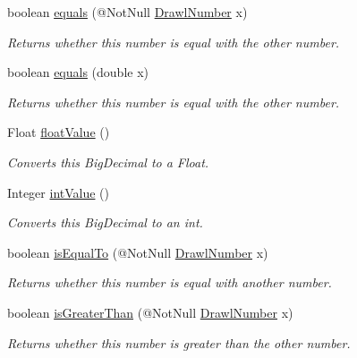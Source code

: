 \begin{DoxyCompactItemize}
boolean \hyperlink{classcom_1_1aarrelaakso_1_1drawl_1_1_drawl_number_aec32f189f8dadb219bf445be55ea0def}{equals} (@Not\+Null \hyperlink{classcom_1_1aarrelaakso_1_1drawl_1_1_drawl_number}{Drawl\+Number} x)
\begin{DoxyCompactList}\small\item\em Returns whether this number is equal with the other number. \end{DoxyCompactList}\item 
boolean \hyperlink{classcom_1_1aarrelaakso_1_1drawl_1_1_drawl_number_acd9190a42d7771c2bfe88725c4469274}{equals} (double x)
\begin{DoxyCompactList}\small\item\em Returns whether this number is equal with the other number. \end{DoxyCompactList}\item 
Float \hyperlink{classcom_1_1aarrelaakso_1_1drawl_1_1_drawl_number_ae8442cbd5cc7ab0c35c0302b196b3819}{float\+Value} ()
\begin{DoxyCompactList}\small\item\em Converts this Big\+Decimal to a Float. \end{DoxyCompactList}\item 
Integer \hyperlink{classcom_1_1aarrelaakso_1_1drawl_1_1_drawl_number_a8022d04415c5449344ac1e23658f8802}{int\+Value} ()
\begin{DoxyCompactList}\small\item\em Converts this Big\+Decimal to an int. \end{DoxyCompactList}\item 
boolean \hyperlink{classcom_1_1aarrelaakso_1_1drawl_1_1_drawl_number_a2c478cd04c27511360f2f6a3d519a7c3}{is\+Equal\+To} (@Not\+Null \hyperlink{classcom_1_1aarrelaakso_1_1drawl_1_1_drawl_number}{Drawl\+Number} x)
\begin{DoxyCompactList}\small\item\em Returns whether this number is equal with another number. \end{DoxyCompactList}\item 
boolean \hyperlink{classcom_1_1aarrelaakso_1_1drawl_1_1_drawl_number_a9e027810c3faea94d4918cb37e8dc647}{is\+Greater\+Than} (@Not\+Null \hyperlink{classcom_1_1aarrelaakso_1_1drawl_1_1_drawl_number}{Drawl\+Number} x)
\begin{DoxyCompactList}\small\item\em Returns whether this number is greater than the other number. \end{DoxyCompactList}\item 

\end{DoxyCompactItemize}
